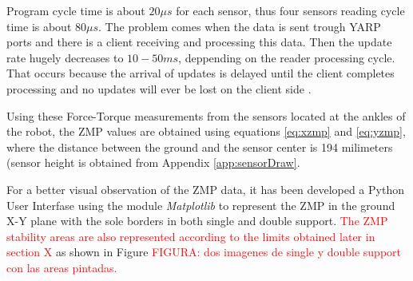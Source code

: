 Program cycle time is about $20 \mu s$ for each sensor, thus four sensors reading cycle time is about $80 \mu s$. The problem comes when the data is sent trough YARP ports and there is a client receiving and processing this data. Then the update rate hugely decreases to $10 - 50 ms$, deppending on the reader processing cycle. That occurs because the arrival of updates is delayed until the client completes processing and no updates will ever be lost on the client side \cite{Yarp2006}.

Using these Force-Torque measurements from the sensors located at the ankles of the robot, the ZMP values are obtained using equations \eqref{eq:xzmp} and \eqref{eq:yzmp}, where the distance between the ground and the sensor center is 194 milimeters (sensor height is obtained from Appendix \ref{app:sensorDraw}.

For a better visual observation of the ZMP data, it has been developed a Python User Interfase using the module \textit{Matplotlib} to represent the ZMP in the ground X-Y plane with the sole borders in both single and double support. \textcolor{red}{The ZMP stability areas are also represented according to the limits obtained later in section X} as shown in Figure \textcolor{red}{FIGURA: dos imagenes de single y double support con las areas pintadas.}